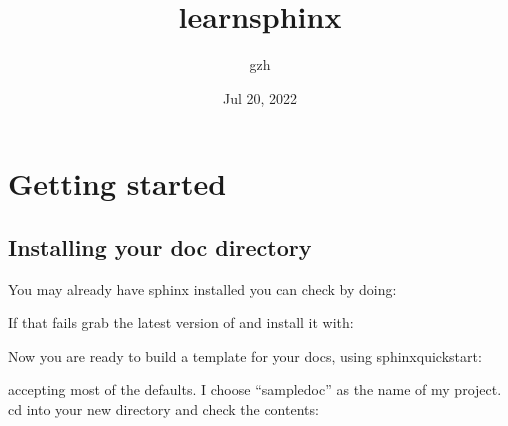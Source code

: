 \documentclass[letterpaper,10pt,english]{sphinxmanual}
\title{learn\sphinxhyphen{}sphinx}
\date{Jul 20, 2022}
\author{gzh}
\begin{document}
\pagestyle{empty}
\sphinxmaketitle
\pagestyle{plain}
\sphinxtableofcontents
\pagestyle{normal}
\label{\detokenize{index::doc}}



\chapter{Getting started}
\label{\detokenize{chapter1:getting-started}}\label{\detokenize{chapter1:id1}}\label{\detokenize{chapter1::doc}}

\section{Installing your doc directory}
\label{\detokenize{chapter1:installing-your-doc-directory}}\label{\detokenize{chapter1:installing-docdir}}
\sphinxAtStartPar
You may already have sphinx 
installed \textendash{} you can check by doing:

\begin{sphinxVerbatim}[commandchars=\\\{\}]
  
\end{sphinxVerbatim}

\sphinxAtStartPar
If that fails grab the latest version of and install it with:

\begin{sphinxVerbatim}[commandchars=\\\{\}]
    
\end{sphinxVerbatim}

\sphinxAtStartPar
Now you are ready to build a template for your docs, using
sphinx\sphinxhyphen{}quickstart:

\begin{sphinxVerbatim}[commandchars=\\\{\}]
 
\end{sphinxVerbatim}

\sphinxAtStartPar
accepting most of the defaults.  I choose “sampledoc” as the name of my
project.  cd into your new directory and check the contents:

\begin{sphinxVerbatim}[commandchars=\\\{\}]
 
               
               
\end{sphinxVerbatim}
\end{document}
